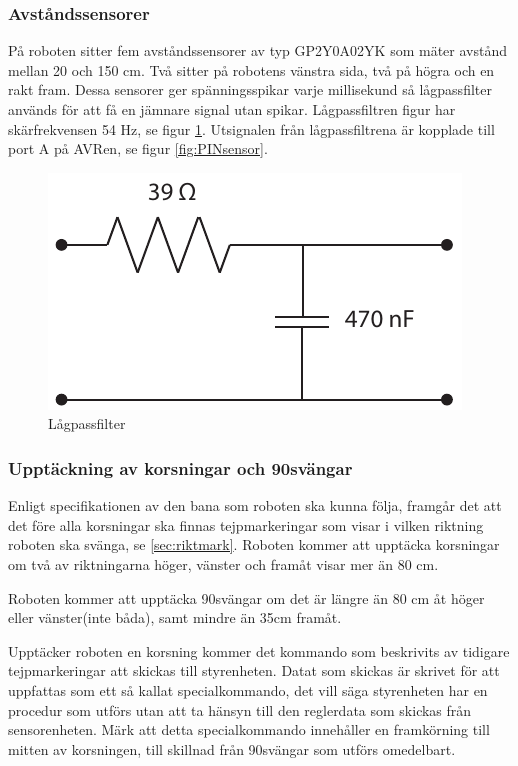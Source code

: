 \subsubsection{Avståndssensorer}
På roboten sitter fem avståndssensorer av typ GP2Y0A02YK som mäter avstånd
mellan 20 och 150 cm. Två sitter på robotens vänstra sida, två på högra och en
rakt fram. Dessa sensorer ger spänningsspikar varje millisekund så lågpassfilter
används för att få en jämnare signal utan spikar. Lågpassfiltren figur
har skärfrekvensen 54 Hz, se figur \ref{fig:lagpassfilter}. Utsignalen från
lågpassfiltrena är kopplade till port A på AVRen, se figur \ref{fig:PINsensor}.

\begin{figure}[H]
  \centering
 \includegraphics[angle=0,scale=0.5]{bilder/LPfilter.pdf}
  \caption{Lågpassfilter}
  \label{fig:lagpassfilter}
\end{figure}


\subsubsection{Upptäckning av korsningar och 90\degree svängar}
\label{sec:upptackkorsning}
Enligt specifikationen av den bana som roboten ska kunna följa, framgår det 
att det före alla korsningar ska finnas tejpmarkeringar som visar i vilken 
riktning roboten ska svänga, se \ref{sec:riktmark}. Roboten kommer att 
upptäcka korsningar om två av riktningarna höger, vänster och framåt visar 
mer än 80 cm.

Roboten kommer att upptäcka 90\degree svängar om det är längre än 80 cm åt 
höger eller vänster(inte båda), samt mindre än 35cm framåt.

Upptäcker roboten en korsning kommer det kommando som beskrivits av tidigare 
tejpmarkeringar att skickas till styrenheten. Datat som skickas är skrivet 
för att uppfattas som ett så kallat specialkommando, det vill säga 
styrenheten har en procedur som utförs utan att ta hänsyn till den reglerdata 
som skickas från sensorenheten. Märk att detta specialkommando innehåller en 
framkörning till mitten av korsningen, till skillnad från 90\degree svängar 
som utförs omedelbart.

